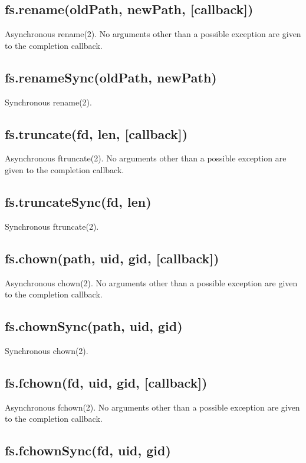 \subsection{fs.rename(oldPath, newPath, {[}callback{]})}

Asynchronous rename(2). No arguments other than a possible exception are
given to the completion callback.

\subsection{fs.renameSync(oldPath, newPath)}

Synchronous rename(2).

\subsection{fs.truncate(fd, len, {[}callback{]})}

Asynchronous ftruncate(2). No arguments other than a possible exception
are given to the completion callback.

\subsection{fs.truncateSync(fd, len)}

Synchronous ftruncate(2).

\subsection{fs.chown(path, uid, gid, {[}callback{]})}

Asynchronous chown(2). No arguments other than a possible exception are
given to the completion callback.

\subsection{fs.chownSync(path, uid, gid)}

Synchronous chown(2).

\subsection{fs.fchown(fd, uid, gid, {[}callback{]})}

Asynchronous fchown(2). No arguments other than a possible exception are
given to the completion callback.

\subsection{fs.fchownSync(fd, uid, gid)}

